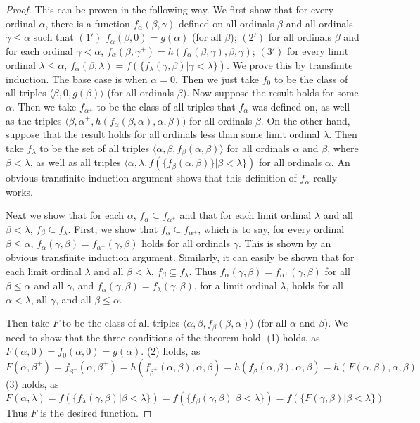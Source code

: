 \documentclass{article}
\theoremstyle{definition}
\begin{document}
\begin{proof}
This can be proven in the following way. We first show that for every ordinal $\alpha$, there is a function 
$f_\alpha(\beta,\gamma)$ defined on all ordinals $\beta$ and all ordinals $\gamma\le\alpha$ such that 
$(1')$ $f_\alpha(\beta,0)=g(\alpha)$ (for all $\beta$); $(2')$ for all ordinals $\beta$ and for each ordinal $\gamma<\alpha$, 
$f_\alpha(\beta,\gamma^+)=h(f_\alpha(\beta,\gamma),\beta,\gamma)$; $(3')$ for every limit ordinal $\lambda\le\alpha$, 
$f_\alpha(\beta,\lambda)=f(\{f_\lambda(\gamma,\beta)|\gamma<\lambda\})$. We prove this by transfinite induction. The base case is when 
$\alpha=0$. Then we just take $f_0$ to be the class of all triples $\langle\beta,0,g(\beta)\rangle$ (for all ordinals $\beta$).
Now suppose the result holds for some $\alpha$. Then we take $f_{\alpha^+}$ to be the class of all triples that $f_\alpha$ was defined
on, as well as the triples $\langle\beta,\alpha^+,h(f_\alpha(\beta,\alpha),\alpha,\beta))$ for all ordinals $\beta$. On the other hand, suppose that 
the result holds for all ordinals less than some limit ordinal $\lambda$. Then take $f_\lambda$ to be the set of all triples 
$\langle\alpha,\beta,f_\beta(\alpha,\beta)\rangle$ for all ordinals $\alpha$ and $\beta$, where $\beta<\lambda$, as well as all triples 
$\langle\alpha,\lambda,f(\{f_\beta(\alpha,\beta)\}|\beta<\lambda\})$ for all ordinals $\alpha$. An obvious transfinite induction argument shows that 
this definition of $f_\alpha$ really works. 

Next we show that for each $\alpha$, $f_\alpha\subseteq f_{\alpha^+}$ and that for each limit ordinal $\lambda$ and all $\beta<\lambda$, 
$f_\beta\subseteq f_\lambda$. First, we show that $f_\alpha\subseteq f_{\alpha^+}$, which is to say, for every ordinal $\beta\le\alpha$, 
$f_\alpha(\gamma,\beta)=f_{\alpha^+}(\gamma,\beta)$ holds for all ordinals $\gamma$. This is shown by an obvious transfinite induction argument. 
Similarly, it can easily be shown that for each limit ordinal $\lambda$ and all $\beta<\lambda$, $f_\beta\subseteq f_\lambda$. Thus 
$f_\alpha(\gamma,\beta)=f_{\alpha^+}(\gamma,\beta)$ for all $\beta\le\alpha$ and all $\gamma$, and $f_\alpha(\gamma,\beta)=f_\lambda(\gamma,\beta)$, for 
a limit ordinal $\lambda$, holds for all $\alpha<\lambda$, all $\gamma$, and all $\beta\le\alpha$.

Then take $F$ to be the class of all triples $\langle\alpha,\beta,f_\beta(\beta,\alpha)\rangle$ (for all $\alpha$ and $\beta$). 
We need to show that the three conditions of the theorem hold. (1) holds, as $F(\alpha,0)=f_0(\alpha,0)=g(\alpha)$. 
(2) holds, as 
\[ F(\alpha,\beta^+)=f_{\beta^+}(\alpha,\beta^+)=h(f_{\beta^+}(\alpha,\beta),\alpha,\beta)=h(f_\beta(\alpha,\beta),\alpha,\beta)=h(F(\alpha,\beta),\alpha,\beta) \]
(3) holds, as \[ F(\alpha,\lambda)=f(\{f_\lambda(\gamma,\beta)|\beta<\lambda\})=f(\{f_\beta(\gamma,\beta)|\beta<\lambda\})=f(\{F(\gamma,\beta)|\beta<\lambda\}) \]
Thus $F$ is the desired function.
\end{proof}
\end{document}
